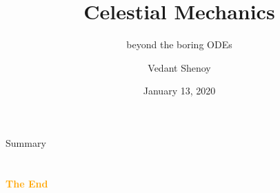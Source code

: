 \documentclass[aspectratio=43]{beamer}
\title{Celestial Mechanics} %
\subtitle{beyond the boring ODEs}
\author[V. Shenoy]{Vedant Shenoy}
\institute[IITB]{
    Indian Institute of Technology Bombay%
    \\%
    Mumbai%
} %
\date{January 13, 2020}
\begin{document}
    
    \frame{\titlepage}
    
    \begin{frame}{Summary}
        \tableofcontents
    \end{frame}
    
    
     
    
    
    

    \section{}
    \begin{frame}{}
        \centering
            \Huge\bfseries
        \textcolor{orange}{The End}
    \end{frame}
\end{document}
